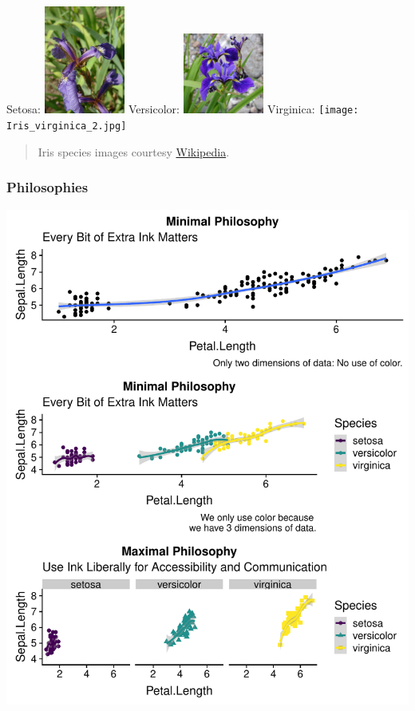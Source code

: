 \documentclass[]{article}
\begin{document}
Setosa:
\includegraphics[width=0.2\textwidth,height=\textheight]{Kosaciec_szczecinkowaty_Iris_setosa.jpg}
Versicolor:
\includegraphics[width=0.2\textwidth,height=\textheight]{Blue_Flag_Ottawa.jpg}
Virginica:
\texttt{[image: Iris\_virginica\_2.jpg]}

\begin{quote}
Iris species images courtesy
\href{https://www.wikipedia.org/}{Wikipedia}.
\end{quote}

\hypertarget{philosophies}{%
\subsubsection{Philosophies}\label{philosophies}}

\includegraphics{design_files/figure-latex/unnamed-chunk-10-1.pdf}
\end{document}
